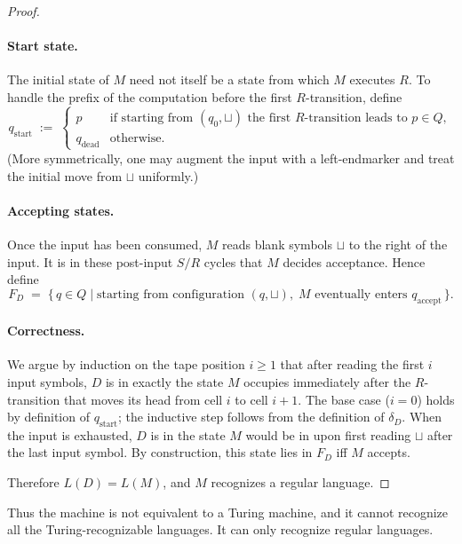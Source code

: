 \documentclass[a4paper, UTF-8]{article}
\theoremstyle{plain}
\begin{document}
\begin{proof}
    \paragraph{Start state.}
    The initial state of $M$ need not itself be a state from which $M$ executes $R$.
    To handle the prefix of the computation before the first $R$-transition, define
    \[
        q_{\text{start}} \;:=\;
        \begin{cases}
            p & \text{if starting from }(q_0, \sqcup)\text{ the first }R\text{-transition leads to }p \in Q,\\
            q_{\text{dead}} & \text{otherwise.}
        \end{cases}
    \]
    (More symmetrically, one may augment the input with a left-endmarker and treat the initial move from $\sqcup$ uniformly.)

    \paragraph{Accepting states.}
    Once the input has been consumed, $M$ reads blank symbols $\sqcup$ to the right of the input.  It is in these post-input $S/R$ cycles that $M$ decides acceptance.  Hence define
    \[
        F_D \;=\; \{\, q \in Q \mid \text{starting from configuration }(q, \sqcup),\; M\text{ eventually enters }q_{\text{accept}} \,\}.
    \]

    \paragraph{Correctness.}
    We argue by induction on the tape position $i \geq 1$ that after reading the first $i$ input symbols, $D$ is in exactly the state $M$ occupies immediately after the $R$-transition that moves its head from cell $i$ to cell $i+1$.  The base case ($i=0$) holds by definition of $q_{\text{start}}$; the inductive step follows from the definition of $\delta_D$.  When the input is exhausted, $D$ is in the state $M$ would be in upon first reading $\sqcup$ after the last input symbol.  By construction, this state lies in $F_D$ iff $M$ accepts.

    Therefore $L(D) = L(M)$, and $M$ recognizes a regular language.
\end{proof}

Thus the machine is not equivalent to a Turing machine, and it cannot recognize all the Turing-recognizable languages. It can only recognize regular languages.
\end{document}
